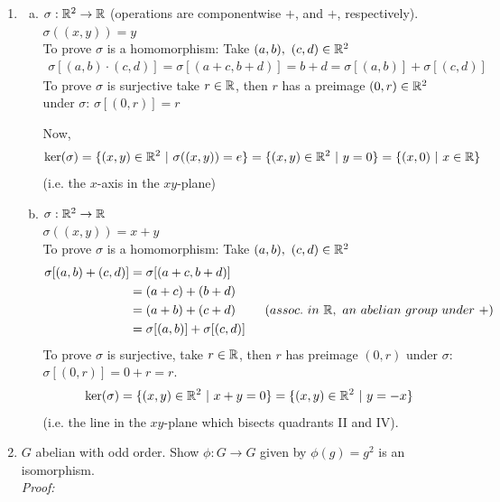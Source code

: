 \begin{enumerate}
    \item \begin{enumerate}[a)]
        \item $\sigma : {\mathbb{R}}^2 \rightarrow {\mathbb{R}}$ (operations are componentwise $+$, and $+$, respectively).\\
        $\sigma((x,y))=y$ \\
        To prove $\sigma$ is a homomorphism: Take $(a,b), \ (c,d)\in {\mathbb{R}}^2$
        \begin{align*}
            \sigma[(a,b)\cdot (c,d)] = \sigma[(a+c,b+d)] = b+d = \sigma[(a,b)]+\sigma[(c,d)]
        \end{align*}
        To prove $\sigma$ is surjective take $r\in {\mathbb{R}}$, then $r$ has a preimage $(0,r)\in {\mathbb{R}}^2$ under $\sigma$: $\sigma[(0,r)]=r$

        Now, 
        \begin{align*}
            \text{ker}(\sigma) = \{(x,y) \in {\mathbb{R}}^2 \ | \ \sigma((x,y))= e\} = \{(x,y)\in {\mathbb{R}}^2 \ | \ y=0\} = \{(x,0) \ | \ x\in {\mathbb{R}}\}
        \end{align*}
        (i.e. the $x$-axis in the $xy$-plane)
        \item $\sigma : {\mathbb{R}}^2 \rightarrow {\mathbb{R}}$ \\
        $\sigma((x,y))= x+y$ \\
        To prove $\sigma$ is a homomorphism: Take $(a,b), \ (c,d)\in {\mathbb{R}}^2 $
        \begin{align*}
            \sigma[(a,b)+(c,d)] &= \sigma[(a+c,b+d)] \\
            &= (a+c)+(b+d) \\ 
            &= (a+b) + (c+d) \ \ \ \ \ \ \ (assoc. \ in \ \R, \ an \ abelian \ group \ under \ +) \\
            &= \sigma[(a,b)]+ \sigma[(c,d)]
        \end{align*}
        To prove $\sigma$ is surjective, take $r\in {\mathbb{R}}$, then $r$ has preimage $(0,r)$ under $\sigma$: $\sigma[(0,r)]=0+r=r$.
        \begin{align*}
            \text{ker}(\sigma) = \{(x,y)\in {\mathbb{R}}^2 \ | \ x+y=0\} = \{(x,y)\in {\mathbb{R}}^2 \ | \ y=-x \}
        \end{align*}
        (i.e. the line in the $xy$-plane which bisects quadrants II and IV).
    \end{enumerate}
    \item $G$ abelian with odd order. Show $\phi: G \rightarrow G$ given by $\phi(g)=g^2$ is an isomorphism. \\
    \textit{Proof:} \\

\end{enumerate}
